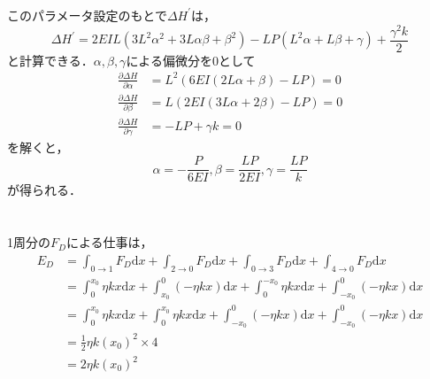 \documentclass[a4paper]{jsarticle}
\begin{document}
\subsubsection{}
このパラメータ設定のもとで$\Delta H^{\prime}$は，
\begin{equation}
  \Delta H^{\prime} =
  2 E I L \left(3 L^{2} \alpha^{2} + 3 L \alpha \beta + \beta^{2}\right) - L P \left(L^{2} \alpha + L \beta + \gamma\right) + \frac{\gamma^{2} k}{2}
\end{equation}
と計算できる．$\alpha, \beta, \gamma$による偏微分を$0$として
\begin{align}
  \frac{\partial \Delta H}{\partial \alpha} & =
  L^{2} \left(6 E I \left(2 L \alpha + \beta\right) - L P\right) = 0 \\
  \frac{\partial \Delta H}{\partial \beta}  & =
  L \left(2 E I \left(3 L \alpha + 2 \beta\right) - L P\right)= 0    \\
  \frac{\partial \Delta H}{\partial \gamma} & =
  -L P + \gamma k = 0
\end{align}
を解くと，
\begin{equation}
  \alpha = -\frac{P}{6 E I}, \beta = \frac{LP}{2EI},
  \gamma= \frac{LP}{k}
\end{equation}
が得られる．

\section{}
\subsection{}
1周分の$F_D$による仕事は，
\begin{equation}
  \begin{aligned}
    E_D & =
    \int_{0 \rightarrow 1} F_D \mathrm{d} x +
    \int_{2 \rightarrow 0} F_D \mathrm{d} x +
    \int_{0 \rightarrow 3} F_D \mathrm{d} x +
    \int_{4 \rightarrow 0} F_D \mathrm{d} x        \\ &=
    \int_{0}^{x_0} \eta k x \mathrm{d} x +
    \int_{x_0}^{0} (-\eta k x) \mathrm{d} x +
    \int_{0}^{-x_0} \eta k x \mathrm{d} x +
    \int_{-x_0}^{0} (-\eta k x) \mathrm{d} x       \\ &=
    \int_{0}^{x_0} \eta k x \mathrm{d} x +
    \int_{0}^{x_0} \eta k x \mathrm{d} x +
    \int_{-x_0}^{0} (-\eta k x) \mathrm{d} x +
    \int_{-x_0}^{0} (-\eta k x) \mathrm{d} x       \\ &=
    \frac{1}{2} \eta k \left(x_0\right)^2 \times 4 \\
        & = 2 \eta k \left(x_0\right)^2
  \end{aligned}
\end{equation}
\end{document}
